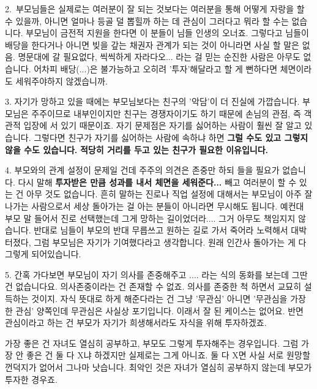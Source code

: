 \item 2. 부모님들은 실제로는 여러분이 잘 되는 것보다는
여러분을 통해 어떻게 자랑을 할 수 있을까, 아니면 얼마나 등골 덜 뽑힐까 하는 데 관심이
그러다고 뭐라 할 수는 없습니다. 부모님이 금전적 지원을 한다면 이 분들이 님들 인생의 오너죠.
그렇다고 님들이 배당을 한다거나 아니면 빚을 갚는 채권자 관계가 되는 것이 아니라면 사실 할 말은 없음.
명문대에 갈 필요없다, 씩씩하게 자라다오... 라는 걸 믿는 순진한 사람은 아무도 없습니다.
어차피 배당(...)은 불가능하고 오히려 '투자'해달라고 할 게 뻔하다면 체면이라도 세워주야하지 않겠습니까.
\vspace{5mm}

\item 3. 자기가 망하고 있을 때에는 부모님보다는 친구의 '악담'이 더 진실에 가깝습니다.
부모님은 주주이므로 내부인이지만 친구는 경쟁자이기도 하기 때문에 손님의 관점, 즉 객관적 입장에 서 있기 때문이죠.
자기 문제점은 자기를 싫어하는 사람이 훨씬 잘 알고 있습니다.
그렇다면 친구가 자기를 싫어하는 사람에 속하냐 하면 \textbf{그럴 수도 있고 그렇지 않을 수도 있습니다.}
\textbf{적당히 거리를 두고 있는 친구가 필요한 이유입니다.}
\vspace{5mm}

\item 4. 부모와의 관계 설정이 문제일 건데 주주의 의견은 존중만 하되 들을 필요가 없습니다.
다시 말해 \textbf{투자받은 만큼 성과를 내서 체면을 세워준다...} 빼고 여러분이 할 수 있는 건 아무 것도 없습니다.
흔히 말하는 진로나 직업 설정에 대해서는 부모님이 아주 잘 나가는 사람으로서 세상 돌아가는 걸 아는 분들이 아니라면 무시해도 됩니다.
예컨대 부모 말 들어서 진로 선택했는데 그게 망하는 길이었더라.... 그거 아무도 책임지지 않습니다.
반대로 님들이 부모의 반대 무릅쓰고 원하는 길로 가서 죽어라 노력해서 대박 터졌다, 그럼 부모님은 자기가 기여했다라고 생각합니다.
원래 인간사 돌아가는 게 다 그렇게 되어있습니다.
\vspace{5mm}

\item 5. 간혹 가다보면 부모님이 자기 의사를 존중해주고 .... 라는 식의 동화를 보는데 그딴 건 없습니다요.
의사존중이라는 건 존재할 수 없죠. 의사를 존중한 척 하면서 교묘히 설득하는 것이지.
자식 뜻대로 하게 해준다라는 건 그냥 '무관심' 아니면 '무관심을 가장한 관심' 양쪽인데
무관심은 사실상 포기입니다. 이래서 잘 된 케이스는 없어요.
반면 관심이라고 하는 건 부모가 자기가 희생해서라도 자식을 위해 투자하겠죠.
\vspace{5mm}

가장 좋은 건 자녀도 열심히 공부하고, 부모도 그렇게 투자해주는 경우입니다.
그럼 가장 안 좋은 건 둘 다 X냐 하겠지만 실제로는 그게 아니죠. 둘 다 X면 사실 서로 원망할 껀덕지가 없어서 그나마 낫습니다.
최악인 것은 자녀가 열심히 공부하지 않는데 부모가 투자한 경우죠.
\vspace{5mm}







